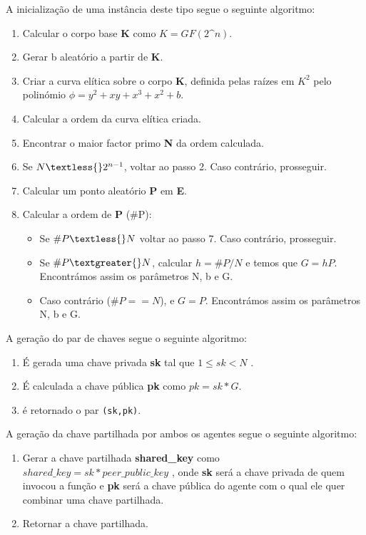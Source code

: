 \documentclass[11pt]{article}
\providecommand{\tightlist}{%
      \setlength{\itemsep}{0pt}\setlength{\parskip}{0pt}}
\begin{document}
A inicialização de uma instância deste tipo segue o seguinte algoritmo:

\begin{enumerate}
\def\labelenumi{\arabic{enumi}.}
\tightlist
\item
  Calcular o corpo base \textbf{K} como $K = GF(2\^{}n) $.
\item
  Gerar b aleatório a partir de \textbf{K}.
\item
  Criar a curva elítica sobre o corpo \textbf{K}, definida pelas raízes
  em \(K^2\) pelo polinómio $ \phi = y^{2} + xy + x^{3} + x^{2} +
  b$.
\item
  Calcular a ordem da curva elítica criada.
\item
  Encontrar o maior factor primo \textbf{N} da ordem calculada.
\item
  Se $ N \textless{} 2^{n-1} $, voltar ao passo 2. Caso
  contrário, prosseguir.
\item
  Calcular um ponto aleatório \textbf{P} em \textbf{E}.
\item
  Calcular a ordem de \textbf{P} (\#P):

  \begin{itemize}
  \tightlist
  \item
    Se $ \#P \textless{} N $ voltar ao passo 7. Caso contrário,
    prosseguir.
  \item
    Se $ \#P \textgreater{} N $, calcular $ h = \#P/N $ e temos que
    $ G = hP $. Encontrámos assim os parâmetros N, b e G.
  \item
    Caso contrário ($ \#P == N $), e $ G = P $. Encontrámos assim os
    parâmetros N, b e G.
  \end{itemize}
\end{enumerate}

A geração do par de chaves segue o seguinte algoritmo:

\begin{enumerate}
\def\labelenumi{\arabic{enumi}.}
\tightlist
\item
  É gerada uma chave privada \textbf{sk} tal que $ 1 \leqslant sk
  < N $ .
\item
  É calculada a chave pública \textbf{pk} como $ pk = sk * G $.
\item
  é retornado o par \texttt{(sk,pk)}.
\end{enumerate}

A geração da chave partilhada por ambos os agentes segue o seguinte
algoritmo:

\begin{enumerate}
\def\labelenumi{\arabic{enumi}.}
\tightlist
\item
  Gerar a chave partilhada \textbf{shared\_key} como $ shared\_key = sk
  * peer\_public\_key $ , onde \textbf{sk} será a chave privada de
  quem invocou a função e \textbf{pk} será a chave pública do agente com
  o qual ele quer combinar uma chave partilhada.
\item
  Retornar a chave partilhada.
\end{enumerate}
\end{document}
